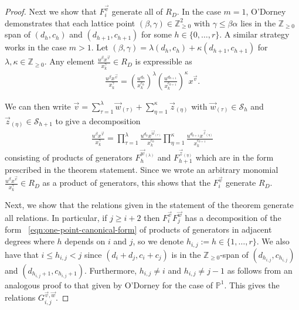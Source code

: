 \documentclass{amsart}
\theoremstyle{plain}
\theoremstyle{definition}
\theoremstyle{remark}
\numberwithin{equation}{section}
\newcommand\bp{{\mathbb P}}
\newcommand\bz{{\mathbb Z}}
\newcommand\mss{\mathscr{S}}
\begin{document}
\begin{proof}
Next we show that $F^{\vec v}_i$ generate all of $R_D$. In the case $m = 1$, O'Dorney \cite[Theorem 6]
{dorney:canonical} demonstrates that each lattice point $(\beta, \gamma) \in
\bz_{\geq 0}^2$ with $\gamma \leq \beta \alpha$ lies in the $\bz_{\geq 0}$ span
of $(d_h, c_h)$ and $(d_{h + 1}, c_{h + 1})$ for
some $h \in \{0, \ldots, r\}$. A similar strategy works in the case $m > 1$. Let $(\beta, \gamma) = \lambda
(d_h, c_h) + \kappa (d_{h + 1}, c_{h + 1})$ for $\lambda, \kappa \in
\bz_{\geq 0}$. Any element $\frac{u^{\beta}
x^{\vec{v}}} {x_k^{ \gamma}} \in R_D$ is expressible as
\begin{align*}
	\frac{u^{\beta} x^{\vec{v}}} {x_k^{\gamma}} = \left(\frac{u^{d_h}}
	{x_k^{c_h}}\right)^{\lambda} \left(\frac{u^{d_{h + 1}}}
	{x_k^{c_{h + 1}}}\right)^{\kappa} x^{\vec{v}}.
\end{align*}

\noindent
We can then write $\vec{v}  = \sum_{\tau=1}^{\lambda}\vec{w}_{(\tau)} +
\sum_{\eta=1}^{\kappa} \vec z_{(\eta)}$ with $\vec w_{(\tau)} \in \mss_h$ and
$\vec z_{(\eta)} \in \mss_{h+1}$ to give a decomposition
\begin{align}
\label{eqn:one-point-canonical-form}
	\frac{u^{\beta} x^{\vec{v}}} {x_k^{\gamma}}	= \prod_{\tau = 1}
	^{\lambda} \frac{u^{d_h} x^{\vec{w}_{(\tau)}}} {x_k^{c_h}}
	\prod_{\eta = 1}^{\kappa} \frac{u^{d_{h + 1}} x^{\vec{z}_{(\eta)}}}
	{x_k^{c_{h + 1}}}
\end{align}
\noindent
consisting of products of generators $F_h^{\vec{w}_{(\lambda)}}$
and $F_{h + 1}^{\vec{z}_{(\eta)}}$ which are in the form
prescribed in the theorem statement. Since we wrote an arbitrary monomial
$\frac{u^{\beta} x^{\vec{v}}}{x_k^\gamma} \in R_D$ as a product of generators,
this shows that the $F_i^{\vec v}$ generate $R_D$.

Next, we show that the relations given in the statement of the theorem generate all relations. 
In particular, if $j \geq i + 2$ then $F_i^{\vec{v}} F_j^{\vec{w}}$
has a decomposition of the form ~\eqref{eqn:one-point-canonical-form} of 
products of generators in adjacent degrees where $h$
depends on $i$ and $ j$, so we denote $h_{i, j} := h \in \{1, \ldots, r\}$. We 
also have that $i \leq h_{i, j} < j$ since $(d_i + d_j, c_i + c_j)$ is in the
$\bz_{\geq 0}$-span of $(d_{h_{i, j}}, c_{h_{i, j}})$ and
$(d_{h_{i, j} + 1}, c_{h_{i, j} + 1})$. Furthermore,
$h_{i, j} \neq i$ and $h_{i, j} \neq j - 1$
as follows from an analogous proof to that given by O'Dorney
\cite[Theorem 6]{dorney:canonical} for the case of
$\bp^1$. This gives the relations
$G_{i, j}^{\vec{v}, \vec{w}}$.


\end{proof}
\end{document}
